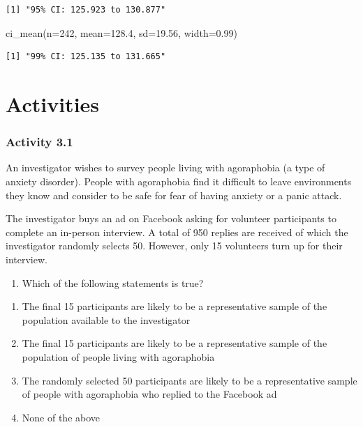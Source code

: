 \documentclass[
  a4paper,
]{memoir}
\newenvironment{Shaded}{\begin{snugshade}}{\end{snugshade}}
\newcommand{\AttributeTok}[1]{\textcolor[rgb]{0.00,0.00,0.00}{#1}}
\newcommand{\DecValTok}[1]{\textcolor[rgb]{0.00,0.00,0.00}{#1}}
\newcommand{\FloatTok}[1]{\textcolor[rgb]{0.00,0.00,0.00}{#1}}
\newcommand{\FunctionTok}[1]{\textcolor[rgb]{0.00,0.00,0.00}{#1}}
\newcommand{\NormalTok}[1]{\textcolor[rgb]{0.00,0.00,0.00}{#1}}
\providecommand{\tightlist}{%
  \setlength{\itemsep}{0pt}\setlength{\parskip}{0pt}}
\begin{document}
\begin{verbatim}
[1] "95% CI: 125.923 to 130.877"
\end{verbatim}

\begin{Shaded}
\begin{Highlighting}[]
\FunctionTok{ci\_mean}\NormalTok{(}\AttributeTok{n=}\DecValTok{242}\NormalTok{, }\AttributeTok{mean=}\FloatTok{128.4}\NormalTok{, }\AttributeTok{sd=}\FloatTok{19.56}\NormalTok{, }\AttributeTok{width=}\FloatTok{0.99}\NormalTok{)}
\end{Highlighting}
\end{Shaded}

\begin{verbatim}
[1] "99% CI: 125.135 to 131.665"
\end{verbatim}

\newpage{}


\chapter*{Activities}\label{activities-2}


\subsection*{Activity 3.1}\label{activity-3.1}

An investigator wishes to survey people living with agoraphobia (a type
of anxiety disorder). People with agoraphobia find it difficult to leave
environments they know and consider to be safe for fear of having
anxiety or a panic attack.

The investigator buys an ad on Facebook asking for volunteer
participants to complete an in-person interview. A total of 950 replies
are received of which the investigator randomly selects 50. However,
only 15 volunteers turn up for their interview.

\begin{enumerate}
\def\labelenumi{\arabic{enumi}.}
\tightlist
\item
  Which of the following statements is true?
\end{enumerate}

\begin{enumerate}
\def\labelenumi{\alph{enumi})}
\tightlist
\item
  The final 15 participants are likely to be a representative sample of
  the population available to the investigator
\item
  The final 15 participants are likely to be a representative sample of
  the population of people living with agoraphobia
\item
  The randomly selected 50 participants are likely to be a
  representative sample of people with agoraphobia who replied to the
  Facebook ad
\item
  None of the above
\end{enumerate}
\end{document}
